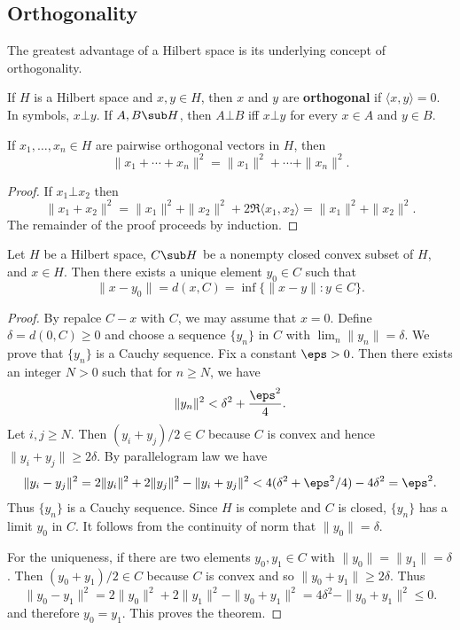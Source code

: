 \subsection{Orthogonality}
The greatest advantage of a Hilbert space is its underlying concept of orthogonality.
\begin{definition}
If $H$ is a Hilbert space and $x,y\in H$, then $x$ and $y$ are \textbf{orthogonal} if $\langle x,y\rangle=0$. In symbols, $x\bot y$. If $A,B\sub H$, then $A\bot B$ iff $x\bot y$ for every $x\in A$ and $y\in B$.
\end{definition}
\begin{proposition}
If $x_1,\dots,x_n\in H$ are pairwise orthogonal vectors in $H$, then
\[\|x_1+\cdots+x_n\|^2=\|x_1\|^2+\cdots+\|x_n\|^2.\]
\end{proposition}
\begin{proof}
If $x_1\bot x_2$ then
\[\|x_1+x_2\|^2=\|x_1\|^2+\|x_2\|^2+2\Re\langle x_1,x_2\rangle=\|x_1\|^2+\|x_2\|^2.\]
The remainder of the proof proceeds by induction.
\end{proof}
\begin{theorem}\label{Hilbert space closed convex minimal element}
Let $H$ be a Hilbert space, $C\sub H$ be a nonempty closed convex subset of $H$, and $x\in H$. Then there exists a unique element $y_0\in C$ such that
\[\|x-y_0\|=d(x,C)=\inf\{\|x-y\|:y\in C\}.\]
\end{theorem}
\begin{proof}
By repalce $C-x$ with $C$, we may assume that $x=0$. Define $\delta=d(0,C)\geq 0$ and choose a sequence $\{y_n\}$ in $C$ with $\lim_n\|y_n\|=\delta$. We prove that $\{y_n\}$ is a Cauchy sequence. Fix a constant $\eps>0$. Then there exists an integer $N>0$ such that for $n\geq N$, we have
\[\|y_n\|^2<\delta^2+\frac{\eps^2}{4}.\]
Let $i,j\geq N$. Then $(y_i+y_j)/2\in C$ because $C$ is convex and hence $\|y_i+y_j\|\geq 2\delta$. By parallelogram law we have
\begin{align*}
\|y_i-y_j\|^2=2\|y_i\|^2+2\|y_j\|^2-\|y_i+y_j\|^2<4(\delta^2+\eps^2/4)-4\delta^2=\eps^2.
\end{align*}
Thus $\{y_n\}$ is a Cauchy sequence. Since $H$ is complete and $C$ is closed, $\{y_n\}$ has a limit $y_0$ in $C$. It follows from the continuity of norm that $\|y_0\|=\delta$.\par
For the uniqueness, if there are two elements $y_0,y_1\in C$ with $\|y_0\|=\|y_1\|=\delta$. Then $(y_0+y_1)/2\in C$ because $C$ is convex and so $\|y_0+y_1\|\geq 2\delta$. Thus
\[\|y_0-y_1\|^2=2\|y_0\|^2+2\|y_1\|^2-\|y_0+y_1\|^2=4\delta^2-\|y_0+y_1\|^2\leq 0.\]
and therefore $y_0=y_1$. This proves the theorem.
\end{proof}
